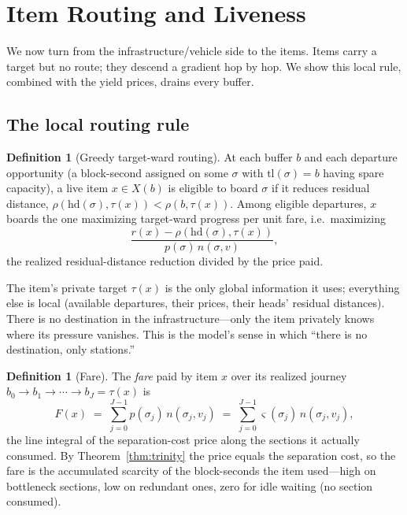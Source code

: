 \documentclass[11pt,twocolumn,a4paper]{article}
\theoremstyle{definition}
\newtheorem{definition}[theorem]{Definition}
\theoremstyle{remark}
\newcommand{\sep}{\varsigma}
\begin{document}
\section{Item Routing and Liveness}
\label{sec:liveness}

We now turn from the infrastructure/vehicle side to the items. Items carry a target but no route; they descend a gradient hop by hop. We show this local rule, combined with the yield prices, drains every buffer.

\subsection{The local routing rule}

\begin{definition}[Greedy target-ward routing]
\label{def:routing}
At each buffer $b$ and each departure opportunity (a block-second assigned on some $\sigma$ with $\mathrm{tl}(\sigma)=b$ having spare capacity), a live item $x\in X(b)$ is eligible to board $\sigma$ if it reduces residual distance, $\rho(\mathrm{hd}(\sigma),\tau(x)) < \rho(b,\tau(x))$. Among eligible departures, $x$ boards the one maximizing target-ward progress per unit fare, i.e.\ maximizing
\begin{equation}
\frac{r(x) - \rho(\mathrm{hd}(\sigma),\tau(x))}{p(\sigma)\,n(\sigma,v)},
\end{equation}
the realized residual-distance reduction divided by the price paid.
\end{definition}

The item's private target $\tau(x)$ is the only global information it uses; everything else is local (available departures, their prices, their heads' residual distances). There is no destination in the infrastructure---only the item privately knows where its pressure vanishes. This is the model's sense in which ``there is no destination, only stations.''

\begin{definition}[Fare]
\label{def:fare}
The \emph{fare} paid by item $x$ over its realized journey $b_0\to b_1 \to\cdots\to b_J = \tau(x)$ is
\begin{equation}
\label{eq:fare}
F(x) \;=\; \sum_{j=0}^{J-1} p(\sigma_j)\,n(\sigma_j, v_j)
\;=\; \sum_{j=0}^{J-1} \sep(\sigma_j)\,n(\sigma_j,v_j),
\end{equation}
the line integral of the separation-cost price along the sections it actually consumed. By Theorem~\ref{thm:trinity} the price equals the separation cost, so the fare is the accumulated scarcity of the block-seconds the item used---high on bottleneck sections, low on redundant ones, zero for idle waiting (no section consumed).
\end{definition}
\end{document}
